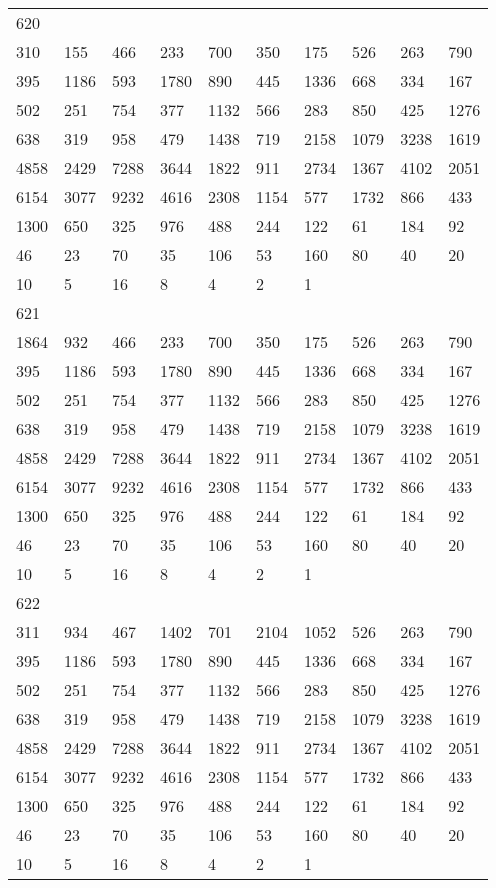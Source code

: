 \begin{longtable}{*{10}{l}}
620&&&&&&&&&\\
310& 155& 466& 233& 700& 350& 175& 526& 263& 790\\
395& 1186& 593& 1780& 890& 445& 1336& 668& 334& 167\\
502& 251& 754& 377& 1132& 566& 283& 850& 425& 1276\\
638& 319& 958& 479& 1438& 719& 2158& 1079& 3238& 1619\\
4858& 2429& 7288& 3644& 1822& 911& 2734& 1367& 4102& 2051\\
6154& 3077& 9232& 4616& 2308& 1154& 577& 1732& 866& 433\\
1300& 650& 325& 976& 488& 244& 122& 61& 184& 92\\
46& 23& 70& 35& 106& 53& 160& 80& 40& 20\\
10& 5& 16& 8& 4& 2& 1& \\

621&&&&&&&&&\\
1864& 932& 466& 233& 700& 350& 175& 526& 263& 790\\
395& 1186& 593& 1780& 890& 445& 1336& 668& 334& 167\\
502& 251& 754& 377& 1132& 566& 283& 850& 425& 1276\\
638& 319& 958& 479& 1438& 719& 2158& 1079& 3238& 1619\\
4858& 2429& 7288& 3644& 1822& 911& 2734& 1367& 4102& 2051\\
6154& 3077& 9232& 4616& 2308& 1154& 577& 1732& 866& 433\\
1300& 650& 325& 976& 488& 244& 122& 61& 184& 92\\
46& 23& 70& 35& 106& 53& 160& 80& 40& 20\\
10& 5& 16& 8& 4& 2& 1& \\

622&&&&&&&&&\\
311& 934& 467& 1402& 701& 2104& 1052& 526& 263& 790\\
395& 1186& 593& 1780& 890& 445& 1336& 668& 334& 167\\
502& 251& 754& 377& 1132& 566& 283& 850& 425& 1276\\
638& 319& 958& 479& 1438& 719& 2158& 1079& 3238& 1619\\
4858& 2429& 7288& 3644& 1822& 911& 2734& 1367& 4102& 2051\\
6154& 3077& 9232& 4616& 2308& 1154& 577& 1732& 866& 433\\
1300& 650& 325& 976& 488& 244& 122& 61& 184& 92\\
46& 23& 70& 35& 106& 53& 160& 80& 40& 20\\
10& 5& 16& 8& 4& 2& 1& \\


\end{longtable}
